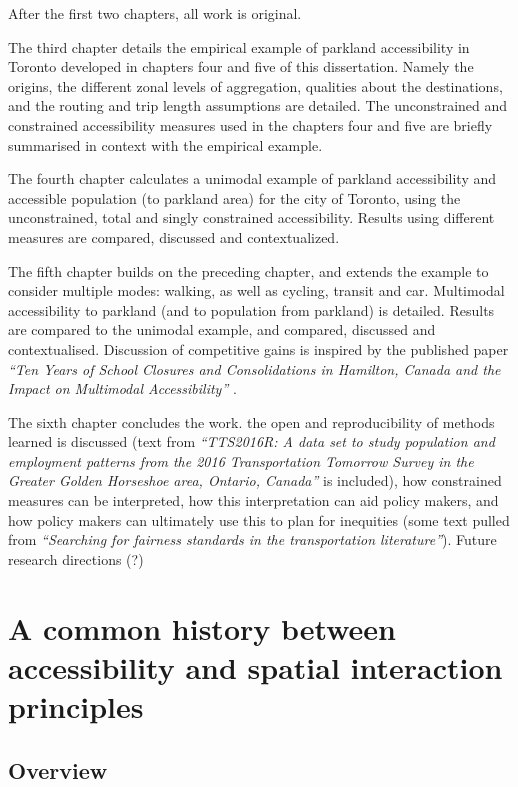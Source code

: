 \documentclass[
11pt, %
oneside, %
english, %
singlespacing, %
]{macthesis} %
\begin{document}
After the first two chapters, all work is original.

The third chapter details the empirical example of parkland accessibility in Toronto developed in chapters four and five of this dissertation. Namely the origins, the different zonal levels of aggregation, qualities about the destinations, and the routing and trip length assumptions are detailed. The unconstrained and constrained accessibility measures used in the chapters four and five are briefly summarised in context with the empirical example.

The fourth chapter calculates a unimodal example of parkland accessibility and accessible population (to parkland area) for the city of Toronto, using the unconstrained, total and singly constrained accessibility. Results using different measures are compared, discussed and contextualized.

The fifth chapter builds on the preceding chapter, and extends the example to consider multiple modes: walking, as well as cycling, transit and car. Multimodal accessibility to parkland (and to population from parkland) is detailed. Results are compared to the unimodal example, and compared, discussed and contextualised. Discussion of competitive gains is inspired by the published paper \emph{``Ten Years of School Closures and Consolidations in Hamilton, Canada and the Impact on Multimodal Accessibility''} .

The sixth chapter concludes the work. the open and reproducibility of methods learned is discussed (text from \emph{``TTS2016R: A data set to study population and employment patterns from the 2016 Transportation Tomorrow Survey in the Greater Golden Horseshoe area, Ontario, Canada''} is included), how constrained measures can be interpreted, how this interpretation can aid policy makers, and how policy makers can ultimately use this to plan for inequities (some text pulled from \emph{``Searching for fairness standards in the transportation literature''}). Future research directions (?)

\chapter{A common history between accessibility and spatial interaction principles}\label{a-common-history-between-accessibility-and-spatial-interaction-principles}

\section{Overview}\label{overview}
\end{document}
